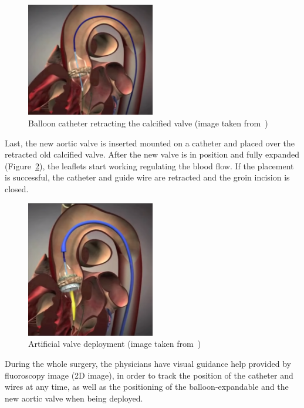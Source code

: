 \begin{figure}[ht]
   \centering
   \includegraphics[width=0.5\textwidth]{img/TAVIBallon.PNG}
   \caption{Balloon catheter retracting the calcified valve (image taken from~\protect\cite{tavivideo})}
   \label{img:TAVIBalloon}
\end{figure}

Last, the new aortic valve is inserted mounted on a catheter and placed over the retracted old calcified valve. After the new valve is in position and fully expanded  (Figure~\ref{img:TAVIValve}), the leaflets start working regulating the blood flow. If the placement is successful, the catheter and guide wire are retracted and the groin incision is closed.\\

\begin{figure}[ht]
   \centering
   \includegraphics[width=0.5\textwidth]{img/TAVIValve.PNG}
   \caption{Artificial valve deployment (image taken from~\protect\cite{tavivideo})}
   \label{img:TAVIValve}
\end{figure}

During the whole surgery, the physicians have visual guidance help provided by fluoroscopy image (2D image), in order to track the position of the catheter and wires at any time, as well as the positioning of the balloon-expandable and the new aortic valve when being deployed.\\
\clearpage

